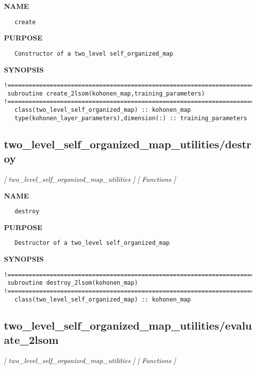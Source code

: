 \documentclass{article}
\begin{document}
\label{ch:robo66}
\label{ch:two_level_self_organized_map_utilities_create}
\textbf{NAME}
\begin{verbatim}
   create
\end{verbatim}
\textbf{PURPOSE}
\begin{verbatim}
   Constructor of a two_level self_organized_map 
\end{verbatim}
\textbf{SYNOPSIS}
\begin{verbatim}
!========================================================================================
 subroutine create_2lsom(kohonen_map,training_parameters)
!========================================================================================
   class(two_level_self_organized_map) :: kohonen_map
   type(kohonen_layer_parameters),dimension(:) :: training_parameters
\end{verbatim}
\newpage
\subsection{two\_level\_self\_organized\_map\_utilities/destroy}
\textsl{[ two\_level\_self\_organized\_map\_utilities ]}
\textsl{[ Functions ]}

\label{ch:robo67}
\label{ch:two_level_self_organized_map_utilities_destroy}
\textbf{NAME}
\begin{verbatim}
   destroy
\end{verbatim}
\textbf{PURPOSE}
\begin{verbatim}
   Destructor of a two_level self_organized_map 
\end{verbatim}
\textbf{SYNOPSIS}
\begin{verbatim}
!========================================================================================
 subroutine destroy_2lsom(kohonen_map)
!========================================================================================
   class(two_level_self_organized_map) :: kohonen_map
\end{verbatim}
\newpage
\subsection{two\_level\_self\_organized\_map\_utilities/evaluate\_2lsom}
\textsl{[ two\_level\_self\_organized\_map\_utilities ]}
\textsl{[ Functions ]}
\end{document}
